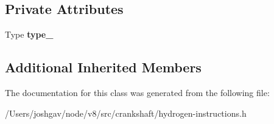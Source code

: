 \subsection*{Private Attributes}
\begin{DoxyCompactItemize}
\item 
Type {\bfseries type\+\_\+}\hypertarget{classv8_1_1internal_1_1_h_stack_check_a935ba981d22a3fbf7aee82acc969d872}{}\label{classv8_1_1internal_1_1_h_stack_check_a935ba981d22a3fbf7aee82acc969d872}

\end{DoxyCompactItemize}
\subsection*{Additional Inherited Members}


The documentation for this class was generated from the following file\+:\begin{DoxyCompactItemize}
\item 
/\+Users/joshgav/node/v8/src/crankshaft/hydrogen-\/instructions.\+h\end{DoxyCompactItemize}
